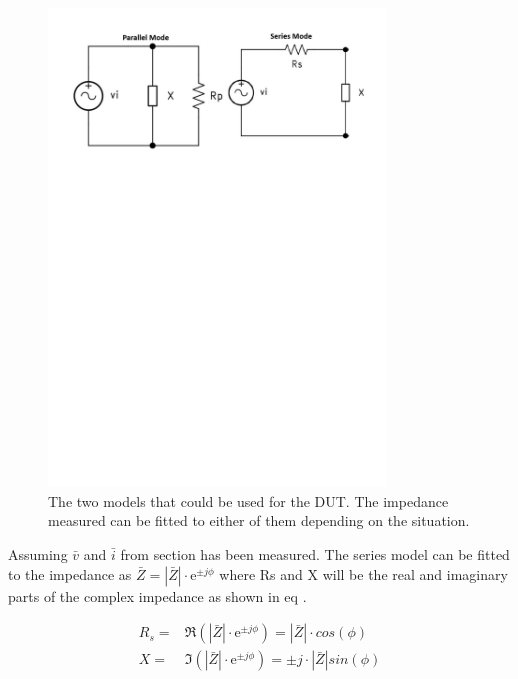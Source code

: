 \begin{figure}[H]
    \centering
    \includegraphics[clip, trim=0 550 0 0, width=0.8\textwidth]{Sections/4_TechnicalAnalysis/Figures/4_1_5_SeriesParallelMode.pdf}
    \caption{The two models that could be used for the DUT. The impedance measured can be fitted to either of them depending on the situation.}
    \label{fig:4_1_5_DUTXSeriesParallelMode}
\end{figure}

Assuming $\bar v$ and $\bar i$ from section  has been measured. The series model can be fitted to the impedance as $\bar Z =|\bar Z| \cdot \mathrm e^{\pm j\phi}$ where Rs and X will be the real and imaginary parts of the complex impedance as shown in eq .

\begin{equation}\label{eq:4_1_5_SeriesModel1}
    \begin{split}
        R_s =& \Re(|\bar Z| \cdot \mathrm e^{\pm j\phi}) = |\bar Z| \cdot cos(\phi)\\
        X =& \Im(|\bar Z| \cdot \mathrm e^{\pm j\phi}) = \pm j\cdot |\bar Z| sin(\phi) 
    \end{split}
\end{equation}

